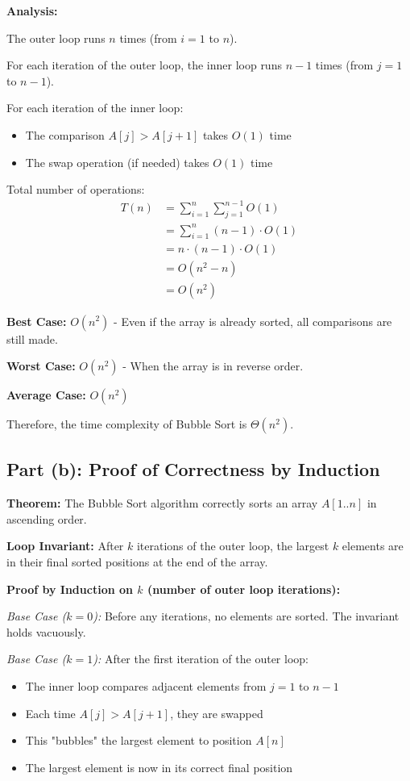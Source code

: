 \documentclass[12pt,a4paper]{article}
\begin{document}
\textbf{Analysis:}

The outer loop runs $n$ times (from $i=1$ to $n$).

For each iteration of the outer loop, the inner loop runs $n-1$ times (from $j=1$ to $n-1$).

For each iteration of the inner loop:
\begin{itemize}
    \item The comparison $A[j] > A[j+1]$ takes $O(1)$ time
    \item The swap operation (if needed) takes $O(1)$ time
\end{itemize}

Total number of operations:
\begin{align*}
T(n) &= \sum_{i=1}^{n} \sum_{j=1}^{n-1} O(1) \\
&= \sum_{i=1}^{n} (n-1) \cdot O(1) \\
&= n \cdot (n-1) \cdot O(1) \\
&= O(n^2 - n) \\
&= O(n^2)
\end{align*}

\textbf{Best Case:} $O(n^2)$ - Even if the array is already sorted, all comparisons are still made.

\textbf{Worst Case:} $O(n^2)$ - When the array is in reverse order.

\textbf{Average Case:} $O(n^2)$

Therefore, the time complexity of Bubble Sort is $\boxed{\Theta(n^2)}$.

\subsection{Part (b): Proof of Correctness by Induction}

\textbf{Theorem:} The Bubble Sort algorithm correctly sorts an array $A[1..n]$ in ascending order.

\textbf{Loop Invariant:} After $k$ iterations of the outer loop, the largest $k$ elements are in their final sorted positions at the end of the array.

\textbf{Proof by Induction on $k$ (number of outer loop iterations):}

\textit{Base Case ($k = 0$):} Before any iterations, no elements are sorted. The invariant holds vacuously.

\textit{Base Case ($k = 1$):} After the first iteration of the outer loop:
\begin{itemize}
    \item The inner loop compares adjacent elements from $j=1$ to $n-1$
    \item Each time $A[j] > A[j+1]$, they are swapped
    \item This "bubbles" the largest element to position $A[n]$
    \item The largest element is now in its correct final position
\end{itemize}
\end{document}
